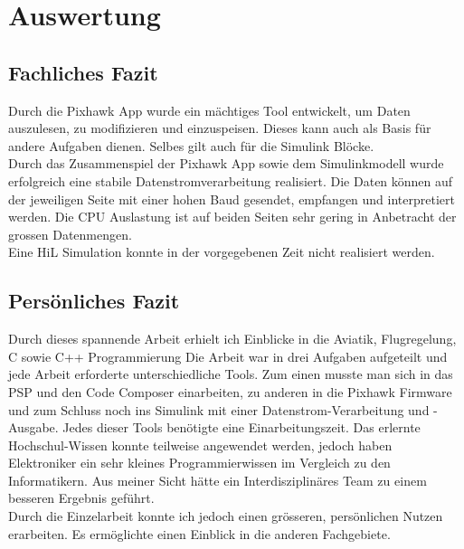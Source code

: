 \section{Auswertung}

\subsection*{Fachliches Fazit}
\noindent 
Durch die Pixhawk App wurde ein mächtiges Tool entwickelt, um Daten auszulesen, zu modifizieren und einzuspeisen. Dieses kann auch als Basis für andere Aufgaben dienen. Selbes gilt auch für die Simulink Blöcke. \\
\noindent
Durch das Zusammenspiel der Pixhawk App sowie dem Simulinkmodell wurde erfolgreich eine stabile Datenstromverarbeitung realisiert. Die Daten können auf der jeweiligen Seite mit einer hohen Baud gesendet, empfangen und interpretiert werden. Die CPU Auslastung ist auf beiden Seiten sehr gering in Anbetracht der grossen Datenmengen.\\
Eine HiL Simulation konnte in der vorgegebenen Zeit nicht realisiert werden.

\subsection*{Persönliches Fazit}
Durch dieses spannende Arbeit erhielt ich Einblicke in die Aviatik, Flugregelung, C sowie C++ Programmierung
Die Arbeit war in drei Aufgaben aufgeteilt und jede Arbeit erforderte unterschiedliche Tools. Zum einen musste man sich in das PSP und den Code Composer einarbeiten, zu anderen in die Pixhawk Firmware und zum Schluss noch ins Simulink mit einer Datenstrom-Verarbeitung und -Ausgabe. Jedes dieser Tools benötigte eine Einarbeitungszeit. Das erlernte Hochschul-Wissen konnte teilweise angewendet werden, jedoch haben Elektroniker ein sehr kleines Programmierwissen im Vergleich zu den Informatikern. Aus meiner Sicht hätte ein Interdisziplinäres Team zu einem besseren Ergebnis geführt.\\
Durch die Einzelarbeit konnte ich jedoch einen grösseren, persönlichen Nutzen erarbeiten. Es ermöglichte einen Einblick in die anderen Fachgebiete.

\clearpage

